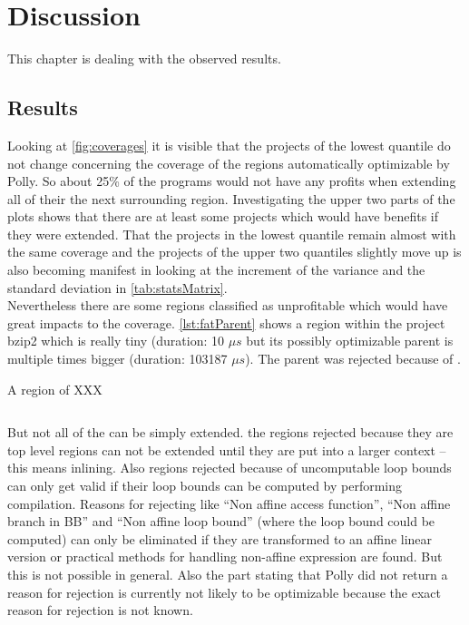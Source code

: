 \chapter{Discussion}
This chapter is dealing with the observed results.

\section{Results}
Looking at \autoref{fig:coverages} it is visible that the projects of the lowest quantile do not change concerning the coverage of the regions automatically optimizable by Polly.
So about 25\% of the programs would not have any profits when extending all of their \scops the next surrounding region.
Investigating the upper two parts of the plots shows that there are at least some projects which would have benefits if they were extended.
That the projects in the lowest quantile remain almost with the same coverage and the projects of the upper two quantiles slightly move up is also becoming manifest in looking at the increment of the variance and the standard deviation in \autoref{tab:statsMatrix}.\\
Nevertheless there are some regions classified as unprofitable which would have great impacts to the coverage.
\autoref{lst:fatParent} shows a region within the project bzip2 which is really tiny (duration: 10 \(\mu s\) but its possibly optimizable parent is multiple times bigger (duration: 103187 \(\mu s\)).
The parent was rejected because of .\\
\begin{code}
    \caption{A region of XXX}
    \inputminted{c++}{cpp/fatParent.cpp}
    \label{lst:fatParent}
\end{code}
But not all of the \scops can be simply extended.
\Eg the regions rejected because they are top level regions can not be extended until they are put into a larger context -- this means inlining.
Also regions rejected because of uncomputable loop bounds can only get valid if their loop bounds can be computed \eg by performing \jit compilation.
Reasons for rejecting like \enquote{Non affine access function}, \enquote{Non affine branch in BB} and \enquote{Non affine loop bound} (where the loop bound could be computed) can only be eliminated if they are transformed to an affine linear version or practical methods for handling non-affine expression are found.
But this is not possible in general. 
Also the part stating that Polly did not return a reason for rejection is currently not likely to be optimizable because the exact reason for rejection is not known.

